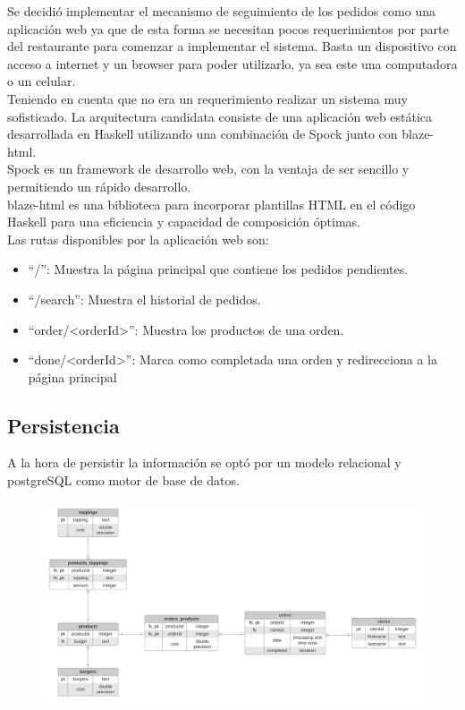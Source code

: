 \documentclass[a4paper,12pt]{article}
\begin{document}
Se decidió implementar el mecanismo de seguimiento de los pedidos como una aplicación web ya que de esta forma se necesitan pocos requerimientos por parte del restaurante para comenzar a implementar el sistema. Basta un dispositivo con acceso a internet y un browser para poder utilizarlo, ya sea este una computadora o un celular.
\\
Teniendo en cuenta que no era un requerimiento realizar un sistema muy sofisticado. La arquitectura candidata consiste de una aplicación web estática desarrollada en Haskell utilizando una combinación de Spock junto con blaze-html.
\\
Spock \cite{spock} es un framework de desarrollo web, con la ventaja de ser sencillo y permitiendo un rápido desarrollo.
\\
blaze-html \cite{blaze-html} es una biblioteca para incorporar plantillas HTML en el código Haskell para una eficiencia y capacidad de composición óptimas.
\\
Las rutas disponibles por la aplicación web son:

\begin{itemize}
	\item 
	\color{blue}“/”\color{black}: Muestra la página principal que contiene los pedidos pendientes.
	\item 
	\color{blue}“/search”\color{black}: Muestra el historial de pedidos.
	\item
	\color{blue}“order/<orderId>”\color{black}: Muestra los productos de una orden.
	\item
	\color{blue}“done/<orderId>”\color{black}: Marca como completada una orden y redirecciona a la página principal
\end{itemize}

\subsection{Persistencia}

A la hora de persistir la información se optó por un modelo relacional y postgreSQL como motor de base de datos.

\begin{figure}[H]
	\centering
	\includegraphics[width=1.0\linewidth]{diagrama-er.jpeg}
\end{figure}
\end{document}
